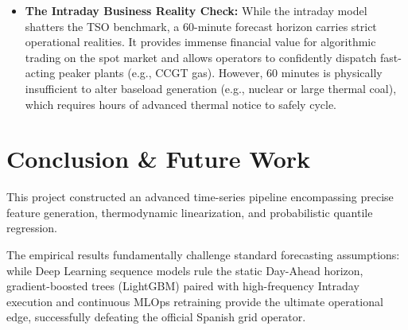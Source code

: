 \documentclass{article}
\begin{document}
\begin{itemize}
    \item \textbf{The Intraday Business Reality Check:} While the intraday model shatters the TSO benchmark, a 60-minute forecast horizon carries strict operational realities. It provides immense financial value for algorithmic trading on the spot market and allows operators to confidently dispatch fast-acting peaker plants (e.g., CCGT gas). However, 60 minutes is physically insufficient to alter baseload generation (e.g., nuclear or large thermal coal), which requires hours of advanced thermal notice to safely cycle.
\end{itemize}

\section{Conclusion \& Future Work}

This project constructed an advanced time-series pipeline encompassing precise feature generation, thermodynamic linearization, and probabilistic quantile regression. 

The empirical results fundamentally challenge standard forecasting assumptions: while Deep Learning sequence models rule the static Day-Ahead horizon, gradient-boosted trees (LightGBM) paired with high-frequency Intraday execution and continuous MLOps retraining provide the ultimate operational edge, successfully defeating the official Spanish grid operator. 
\end{document}
